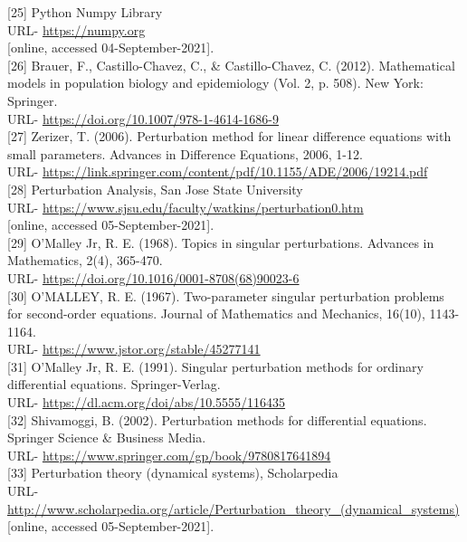 [25] Python Numpy Library \\
URL- \url{https://numpy.org} \\
{[online, accessed 04-September-2021]}. \\

[26] Brauer, F., Castillo-Chavez, C., \& Castillo-Chavez, C. (2012). Mathematical models in population biology and epidemiology (Vol. 2, p. 508). New York: Springer. \\
URL- \url{https://doi.org/10.1007/978-1-4614-1686-9} \\

[27] Zerizer, T. (2006). Perturbation method for linear difference equations with small parameters. Advances in Difference Equations, 2006, 1-12. \\
URL- \url{https://link.springer.com/content/pdf/10.1155/ADE/2006/19214.pdf} \\

[28] Perturbation Analysis, San Jose State University \\
URL- \url{https://www.sjsu.edu/faculty/watkins/perturbation0.htm} \\
{[online, accessed 05-September-2021]}. \\

[29] O'Malley Jr, R. E. (1968). Topics in singular perturbations. Advances in Mathematics, 2(4), 365-470. \\
URL- \url{https://doi.org/10.1016/0001-8708(68)90023-6} \\

[30] O'MALLEY, R. E. (1967). Two-parameter singular perturbation problems for second-order equations. Journal of Mathematics and Mechanics, 16(10), 1143-1164. \\
URL- \url{https://www.jstor.org/stable/45277141} \\

[31] O'Malley Jr, R. E. (1991). Singular perturbation methods for ordinary differential equations. Springer-Verlag. \\
URL- \url{https://dl.acm.org/doi/abs/10.5555/116435} \\

[32] Shivamoggi, B. (2002). Perturbation methods for differential equations. Springer Science \& Business Media. \\
URL- \url{https://www.springer.com/gp/book/9780817641894} \\

[33] Perturbation theory (dynamical systems), Scholarpedia \\
URL- \url{http://www.scholarpedia.org/article/Perturbation_theory_(dynamical_systems)} \\
{[online, accessed 05-September-2021]}. \\

